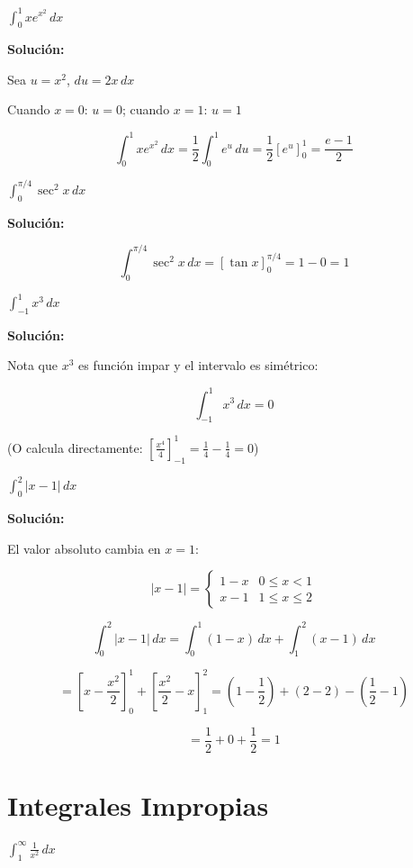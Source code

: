 \documentclass[12pt, a4paper]{book}
\begin{document}
\begin{ejercicio}
$\int_0^1 x e^{x^2} \, dx$
\end{ejercicio}

\textbf{Solución:}

Sea $u = x^2$, $du = 2x \, dx$

Cuando $x = 0$: $u = 0$; cuando $x = 1$: $u = 1$

\[
\int_0^1 x e^{x^2} \, dx = \frac{1}{2}\int_0^1 e^u \, du = \frac{1}{2}[e^u]_0^1 = \frac{e - 1}{2}
\]

\begin{ejercicio}
$\int_0^{\pi/4} \sec^2 x \, dx$
\end{ejercicio}

\textbf{Solución:}

\[
\int_0^{\pi/4} \sec^2 x \, dx = [\tan x]_0^{\pi/4} = 1 - 0 = 1
\]

\begin{ejercicio}
$\int_{-1}^1 x^3 \, dx$
\end{ejercicio}

\textbf{Solución:}

Nota que $x^3$ es función impar y el intervalo es simétrico:

\[
\int_{-1}^1 x^3 \, dx = 0
\]

(O calcula directamente: $[\frac{x^4}{4}]_{-1}^1 = \frac{1}{4} - \frac{1}{4} = 0$)

\begin{ejercicio}
$\int_0^2 |x-1| \, dx$
\end{ejercicio}

\textbf{Solución:}

El valor absoluto cambia en $x = 1$:

\[
|x-1| = \begin{cases} 1-x & 0 \leq x < 1 \\ x-1 & 1 \leq x \leq 2 \end{cases}
\]

\[
\int_0^2 |x-1| \, dx = \int_0^1 (1-x) \, dx + \int_1^2 (x-1) \, dx
\]

\[
= [x - \frac{x^2}{2}]_0^1 + [\frac{x^2}{2} - x]_1^2 = (1 - \frac{1}{2}) + (2 - 2) - (\frac{1}{2} - 1)
\]

\[
= \frac{1}{2} + 0 + \frac{1}{2} = 1
\]

\section{Integrales Impropias}

\begin{ejercicio}
$\int_1^\infty \frac{1}{x^2} \, dx$
\end{ejercicio}
\end{document}
